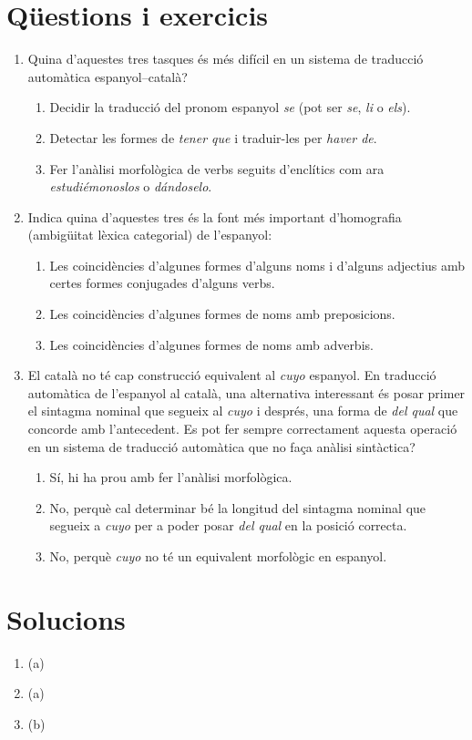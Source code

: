 \section{Qüestions i exercicis}
\begin{enumerate}
\item Quina d'aquestes tres tasques és més difícil en un sistema de
  traducció automàtica espanyol--català?
\begin{enumerate}
\item Decidir la traducció del pronom espanyol \emph{se} (pot ser \emph{se},
\emph{li} o \emph{els}).
\item Detectar les formes de \emph{tener que} i traduir-les per \emph{haver de}.
\item Fer l'anàlisi morfològica de verbs seguits d'enclítics 
com ara \emph{estudiémonoslos} o \emph{dándoselo}.
\end{enumerate}

\item Indica quina d'aquestes tres 
és la font més important d'homografia (ambigüitat lèxica
categorial) de l'espanyol:
\begin{enumerate}
\item Les coincidències d'algunes formes d'alguns  
noms i d'alguns adjectius amb certes formes conjugades d'alguns verbs.
\item Les coincidències d'algunes formes de noms amb preposicions.
\item Les coincidències d'algunes formes de noms amb adverbis.
\end{enumerate}

\item El català no té cap construcció equivalent al \emph{cuyo}
  espanyol. En traducció automàtica de l'espanyol al català, una
  alternativa interessant és posar primer el sintagma nominal que
  segueix al \emph{cuyo} i després, una forma de \emph{del
    qual} que concorde amb l'antecedent. Es pot fer sempre
  correctament aquesta operació 
  en un sistema de traducció automàtica que no faça anàlisi
  sintàctica?
\begin{enumerate}
\item Sí, hi ha prou amb fer l'anàlisi morfològica.
\item No, perquè cal determinar bé la longitud del sintagma nominal
  que segueix a \emph{cuyo} per a poder posar \emph{del qual} en la
  posició correcta.
\item No, perquè \emph{cuyo} no té un equivalent morfològic en
  espanyol.
\end{enumerate}



\end{enumerate}

\section{Solucions}
\begin{enumerate}
\item (a)
\item (a)
\item (b)


\end{enumerate}
